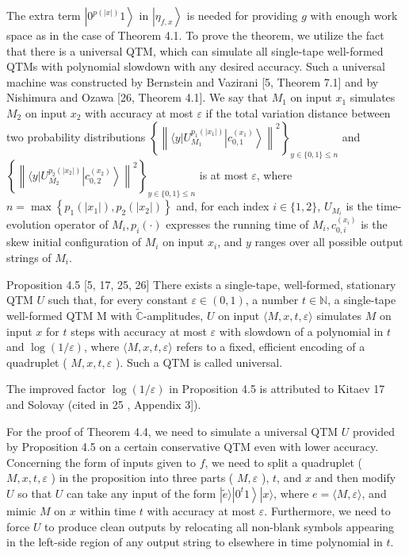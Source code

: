 \documentclass[10pt]{article}
\begin{document}
The extra term $\left|0^{p(|x|)} 1\right\rangle$ in $\left|\eta_{f, x}\right\rangle$ is needed for providing $g$ with enough work space as in the case of Theorem 4.1. To prove the theorem, we utilize the fact that there is a universal QTM, which can simulate all single-tape well-formed QTMs with polynomial slowdown with any desired accuracy. Such a universal machine was constructed by Bernstein and Vazirani [5, Theorem 7.1] and by Nishimura and Ozawa [26, Theorem 4.1]. We say that $M_{1}$ on input $x_{1}$ simulates $M_{2}$ on input $x_{2}$ with accuracy at most $\varepsilon$ if the total variation distance between two probability distributions $\left\{\left\|\langle y| U_{M_{1}}^{p_{1}\left(\left|x_{1}\right|\right)}\left|c_{0,1}^{\left(x_{1}\right)}\right\rangle\right\|^{2}\right\}_{y \in\{0,1\} \leq n}$ and $\left\{\left\|\langle y| U_{M_{2}}^{p_{2}\left(\left|x_{2}\right|\right)}\left|c_{0,2}^{\left(x_{2}\right)}\right\rangle\right\|^{2}\right\}_{y \in\{0,1\} \leq n}$ is at most $\varepsilon$, where $n=\max \left\{p_{1}\left(\left|x_{1}\right|\right), p_{2}\left(\left|x_{2}\right|\right)\right\}$ and, for each index $i \in\{1,2\}$, $U_{M_{i}}$ is the time-evolution operator of $M_{i}, p_{i}(\cdot)$ expresses the running time of $M_{i}, c_{0, i}^{\left(x_{i}\right)}$ is the skew initial configuration of $M_{i}$ on input $x_{i}$, and $y$ ranges over all possible output strings of $M_{i}$.

Proposition 4.5 [5, 17, 25, 26] There exists a single-tape, well-formed, stationary QTM $U$ such that, for every constant $\varepsilon \in(0,1)$, a number $t \in \mathbb{N}$, a single-tape well-formed QTM M with $\tilde{\mathbb{C}}$-amplitudes, $U$ on input $\langle M, x, t, \varepsilon\rangle$ simulates $M$ on input $x$ for $t$ steps with accuracy at most $\varepsilon$ with slowdown of a polynomial in $t$ and $\log (1 / \varepsilon)$, where $\langle M, x, t, \varepsilon\rangle$ refers to a fixed, efficient encoding of a quadruplet ( $M, x, t, \varepsilon$ ). Such a QTM is called universal.

The improved factor $\log (1 / \varepsilon)$ in Proposition 4.5 is attributed to Kitaev 17 and Solovay (cited in 25 , Appendix 3]).

For the proof of Theorem 4.4, we need to simulate a universal QTM $U$ provided by Proposition 4.5 on a certain conservative QTM even with lower accuracy. Concerning the form of inputs given to $f$, we need to split a quadruplet ( $M, x, t, \varepsilon$ ) in the proposition into three parts ( $M, \varepsilon$ ), $t$, and $x$ and then modify $U$ so that $U$ can take any input of the form $|\tilde{e}\rangle\left|0^{t} 1\right\rangle|x\rangle$, where $e=\langle M, \varepsilon\rangle$, and mimic $M$ on $x$ within time $t$ with accuracy at most $\varepsilon$. Furthermore, we need to force $U$ to produce clean outputs by relocating all non-blank symbols appearing in the left-side region of any output string to elsewhere in time polynomial in $t$.
\end{document}
